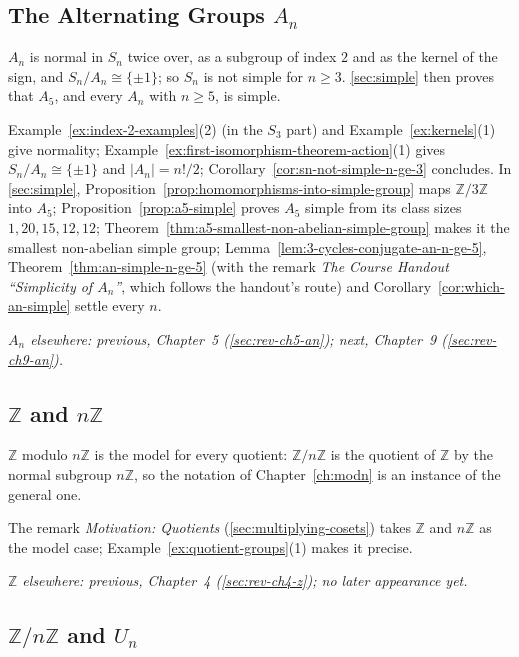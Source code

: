 \documentclass[11pt]{report}
\begin{document}
\subsection{\texorpdfstring{The Alternating Groups $A_n$}{The Alternating Groups Aₙ}}\label{sec:rev-ch8-an}

$A_n$ is normal in $S_n$ twice over, as a subgroup of index $2$ and as the kernel of the sign, and $S_n/A_n \cong \{\pm 1\}$; so $S_n$ is not simple for $n \geq 3$. \ref{sec:simple} then proves that $A_5$, and every $A_n$ with $n \geq 5$, is simple.

Example~\ref{ex:index-2-examples}(2) (in the $S_3$ part) and Example~\ref{ex:kernels}(1) give normality; Example~\ref{ex:first-isomorphism-theorem-action}(1) gives $S_n/A_n \cong \{\pm 1\}$ and $|A_n| = n!/2$; Corollary~\ref{cor:sn-not-simple-n-ge-3} concludes. In \ref{sec:simple}, Proposition~\ref{prop:homomorphisms-into-simple-group} maps $\mathbb{Z}/3\mathbb{Z}$ into $A_5$; Proposition~\ref{prop:a5-simple} proves $A_5$ simple from its class sizes $1, 20, 15, 12, 12$; Theorem~\ref{thm:a5-smallest-non-abelian-simple-group} makes it the smallest non-abelian simple group; Lemma~\ref{lem:3-cycles-conjugate-an-n-ge-5}, Theorem~\ref{thm:an-simple-n-ge-5} (with the remark \emph{The Course Handout ``Simplicity of $A_n$''}, which follows the handout's route) and Corollary~\ref{cor:which-an-simple} settle every $n$.

\textit{$A_n$ elsewhere: previous, Chapter~5 (\ref{sec:rev-ch5-an}); next, Chapter~9 (\ref{sec:rev-ch9-an}).}

\subsection{\texorpdfstring{$\mathbb{Z}$ and $n\mathbb{Z}$}{ℤ and nℤ}}\label{sec:rev-ch8-z}

$\mathbb{Z}$ modulo $n\mathbb{Z}$ is the model for every quotient: $\mathbb{Z}/n\mathbb{Z}$ is the quotient of $\mathbb{Z}$ by the normal subgroup $n\mathbb{Z}$, so the notation of Chapter~\ref{ch:modn} is an instance of the general one.

The remark \emph{Motivation: Quotients} (\ref{sec:multiplying-cosets}) takes $\mathbb{Z}$ and $n\mathbb{Z}$ as the model case; Example~\ref{ex:quotient-groups}(1) makes it precise.

\textit{$\mathbb{Z}$ elsewhere: previous, Chapter~4 (\ref{sec:rev-ch4-z}); no later appearance yet.}

\subsection{\texorpdfstring{$\mathbb{Z}/n\mathbb{Z}$ and $U_n$}{ℤ/nℤ and Uₙ}}\label{sec:rev-ch8-zn}
\end{document}
